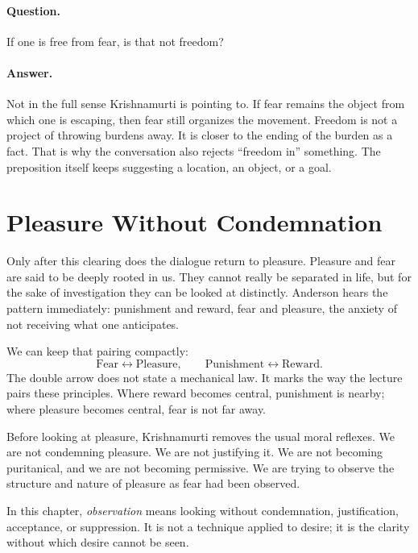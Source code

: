 \paragraph{Question.}
If one is free from fear, is that not freedom?

\paragraph{Answer.}
Not in the full sense Krishnamurti is pointing to. If fear remains the object from which one is escaping, then fear still organizes the movement. Freedom is not a project of throwing burdens away. It is closer to the ending of the burden as a fact. That is why the conversation also rejects ``freedom in'' something. The preposition itself keeps suggesting a location, an object, or a goal.

\section{Pleasure Without Condemnation}

Only after this clearing does the dialogue return to pleasure. Pleasure and fear are said to be deeply rooted in us. They cannot really be separated in life, but for the sake of investigation they can be looked at distinctly. Anderson hears the pattern immediately: punishment and reward, fear and pleasure, the anxiety of not receiving what one anticipates.

We can keep that pairing compactly:
\begin{equation}
\mathrm{Fear} \leftrightarrow \mathrm{Pleasure},
\qquad
\mathrm{Punishment} \leftrightarrow \mathrm{Reward}.
\end{equation}
The double arrow does not state a mechanical law. It marks the way the lecture pairs these principles. Where reward becomes central, punishment is nearby; where pleasure becomes central, fear is not far away.

Before looking at pleasure, Krishnamurti removes the usual moral reflexes. We are not condemning pleasure. We are not justifying it. We are not becoming puritanical, and we are not becoming permissive. We are trying to observe the structure and nature of pleasure as fear had been observed.

\begin{definition}
In this chapter, \emph{observation} means looking without condemnation, justification, acceptance, or suppression. It is not a technique applied to desire; it is the clarity without which desire cannot be seen.
\end{definition}

